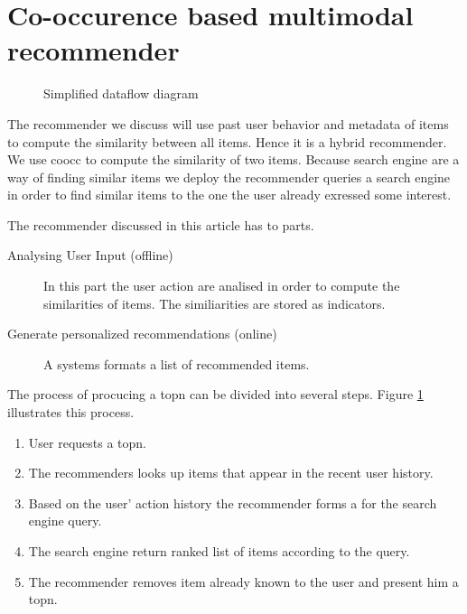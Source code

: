 \section{Co-occurence based multimodal recommender}
\label{sec:design}
\begin{figure}
  \centering
  \caption{Simplified dataflow diagram}
  \label{fig:topndataflow}
\end{figure}

The recommender we discuss will use past user behavior and metadata of items to compute the similarity between all items. Hence it is a hybrid recommender.
We use \gls{coocc} to compute the similarity of two items. Because search engine are a way of finding similar items we deploy the recommender queries a search engine in order to find similar items to the one the user already exressed some interest.

The recommender discussed in this article has to parts.
\begin{description}
\item[Analysing User Input (offline)] In this part the user action are analised in order to compute the similarities of items. The similiarities are stored as indicators.
\item[Generate personalized recommendations (online)] A systems formats a list of recommended items.
\end{description}

The process of procucing a \gls{topn} can be divided into several steps. Figure \ref{fig:topndataflow} illustrates this process.

\begin{enumerate}
\item User requests a \gls{topn}.
\item The recommenders looks up items that appear in the recent user history.
\item Based on the user' action history the recommender forms a for the search engine query.
\item The search engine return ranked list of items according to the query.
\item The recommender removes item already known to the user and present him a \gls{topn}.
\end{enumerate}

